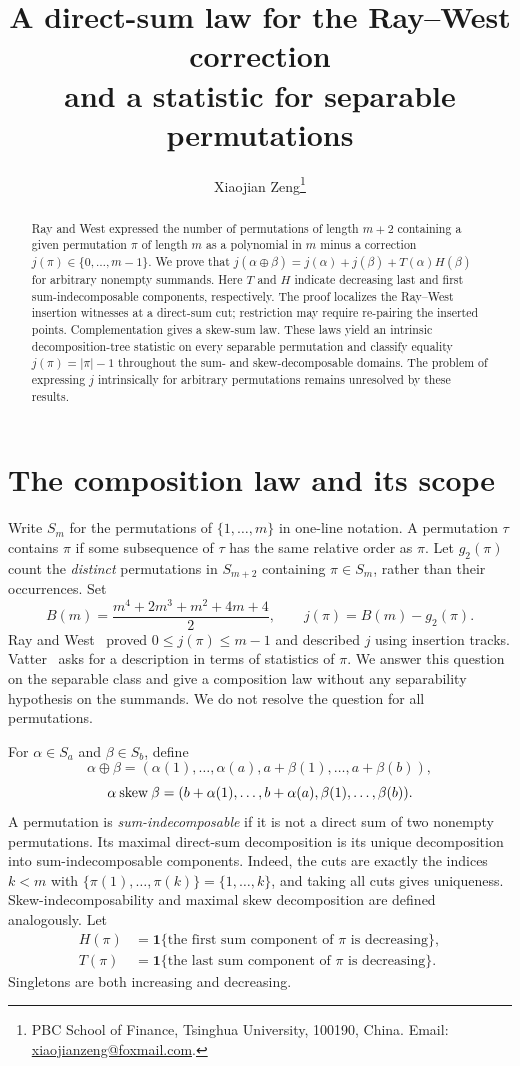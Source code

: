 \documentclass[11pt,a4paper]{article}
\title{A direct-sum law for the Ray--West correction\\
and a statistic for separable permutations}
\author{Xiaojian Zeng\thanks{PBC School of Finance, Tsinghua University,
100190, China. Email: \href{mailto:xiaojianzeng@foxmail.com}{xiaojianzeng@foxmail.com}.}}
\date{}
\theoremstyle{remark}
\newcommand{\ind}{\mathbf{1}}
\begin{document}
\maketitle
\begin{abstract}
Ray and West expressed the number of permutations of length $m+2$
containing a given permutation $\pi$ of length $m$ as a polynomial in $m$
minus a correction $j(\pi)\in\{0,\ldots,m-1\}$. We prove that
$j(\alpha\oplus\beta)=j(\alpha)+j(\beta)+T(\alpha)H(\beta)$ for arbitrary
nonempty summands. Here $T$ and $H$ indicate decreasing last and first
sum-indecomposable components, respectively. The proof localizes the
Ray--West insertion witnesses at a direct-sum cut; restriction may require
re-pairing the inserted points. Complementation gives a skew-sum law.
These laws yield an intrinsic decomposition-tree statistic on every
separable permutation and classify equality $j(\pi)=|\pi|-1$ throughout
the sum- and skew-decomposable domains. The problem of expressing $j$
intrinsically for arbitrary permutations remains unresolved by these results.
\end{abstract}

\section{The composition law and its scope}

Write $S_m$ for the permutations of $\{1,\ldots,m\}$ in one-line notation.
A permutation $\tau$ contains $\pi$ if some subsequence of $\tau$ has the
same relative order as $\pi$. Let $g_2(\pi)$ count the \emph{distinct}
permutations in $S_{m+2}$ containing $\pi\in S_m$, rather than their
occurrences. Set
\begin{equation}\label{eq:residual}
 B(m)=\frac{m^4+2m^3+m^2+4m+4}{2},\qquad
 j(\pi)=B(m)-g_2(\pi).
\end{equation}
Ray and West~\cite[Corollary~8.6 and Theorem~8.7]{raywest}
proved $0\le j(\pi)\le m-1$ and described $j$ using insertion tracks.
Vatter~\cite[Problem~3.7]{vatter} asks for a description in terms of
statistics of $\pi$. We answer this question on the separable class and
give a composition law without any separability hypothesis on the summands.
We do not resolve the question for all permutations.

For $\alpha\in S_a$ and $\beta\in S_b$, define
\[
 \alpha\oplus\beta=
 (\alpha(1),\ldots,\alpha(a),a+\beta(1),\ldots,a+\beta(b)),
\]
\[
 \alpha\mathbin{\mathrm{skew}}\beta=
 (b+\alpha(1),\ldots,b+\alpha(a),\beta(1),\ldots,\beta(b)).
\]
A permutation is \emph{sum-indecomposable} if it is not a direct sum of
two nonempty permutations. Its maximal direct-sum decomposition is its
unique decomposition into sum-indecomposable components. Indeed, the cuts
are exactly the indices $k<m$ with
$\{\pi(1),\ldots,\pi(k)\}=\{1,\ldots,k\}$, and taking all cuts gives
uniqueness. Skew-indecomposability and maximal skew decomposition are
defined analogously. Let
\begin{align*}
 H(\pi)&=\ind\{\text{the first sum component of $\pi$ is decreasing}\},\\
 T(\pi)&=\ind\{\text{the last sum component of $\pi$ is decreasing}\}.
\end{align*}
Singletons are both increasing and decreasing.
\end{document}

